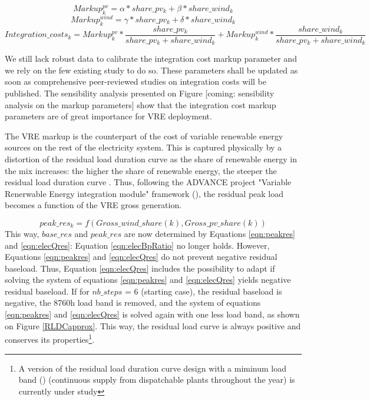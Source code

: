 {\begin{dmath}
    Markup^{pv}_k = \alpha * share\_pv_k + \beta * share\_wind_k
\end{dmath}
\begin{dmath}
    Markup^{wind}_k = \gamma * share\_pv_k + \delta * share\_wind_k
\end{dmath}
\begin{dmath}
    Integration\_costs_k = Markup^{pv}_k * 
    \frac{share\_pv_k}{share\_pv_k + share\_wind_k} + 
    Markup^{wind}_k * \frac{share\_wind_k}{share\_pv_k + share\_wind_k}
\end{dmath}


We still lack robust data to calibrate the integration cost markup parameter and we rely on the few existing study to do so. These parameters shall be updated as soon as comprehensive peer-reviewed studies on integration costs will be published. The sensibility analysis presented on Figure [coming: sensibility analysis on the markup parameters] show that the integration cost markup parameters are of great importance for VRE deployment.

The VRE markup is the counterpart of the cost of variable renewable energy sources on the rest of the electricity system. This is captured physically by a distortion of the residual load duration curve as the share of renewable energy in the mix increases: the higher the share of renewable energy, the steeper the residual load duration curve \cite{Ueckerdt2015}. Thus, following the ADVANCE project "Variable Renerwable Energy integration module" framework (\cite{Ueckerdt2017}), the residual peak load becomes a function of the VRE gross generation.
 
 \begin{dmath}
    {peak\_res_k} = f(Gross\_wind\_share(k),Gross\_pv\_share(k))
    \label{eqn:peakres}
\end{dmath}
 This way, $base\_res$ and $peak\_res$ are now determined by Equations \ref{eqn:peakres} and \ref{eqn:elecQres}: Equation \ref{eqn:elecBpRatio} no longer holds. However, Equations \ref{eqn:peakres} and \ref{eqn:elecQres} do not prevent negative residual baseload. Thus, Equation \ref{eqn:elecQres} includes the possibility to adapt if solving the system of equations \ref{eqn:peakres} and \ref{eqn:elecQres} yields negative residual baseload. If for  $nb\_steps$ = 6 (starting case), the residual baseload is negative, the 8760h load band is removed, and the system of equations \ref{eqn:peakres} and \ref{eqn:elecQres} is solved again with one less load band, as shown on Figure \ref{RLDCapprox}. This way, the residual load curve is always positive and conserves its properties\footnote{A version of the residual load duration curve design with a miminum load band (\cite{Ueckerdt2015}) (continuous supply from dispatchable plants throughout the year) is currently under study}. 

}
